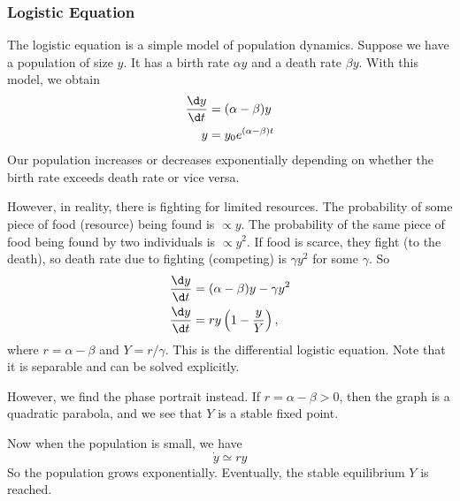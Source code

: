 \documentclass[a4paper]{article}
\begin{document}
\subsubsection{Logistic Equation}
The logistic equation is a simple model of population dynamics. Suppose we have a population of size $y$. It has a birth rate $\alpha y$ and a death rate $\beta y$. With this model, we obtain
\begin{align*}
  \frac{\d y}{\d t} &= (\alpha - \beta)y\\
  y &= y_0 e^{(\alpha - \beta)t}
\end{align*}
Our population increases or decreases exponentially depending on whether the birth rate exceeds death rate or vice versa.

However, in reality, there is fighting for limited resources. The probability of some piece of food (resource) being found is $\propto y$. The probability of the same piece of food being found by two individuals is $\propto y^2$. If food is scarce, they fight (to the death), so death rate due to fighting (competing) is $\gamma y^2$ for some $\gamma$. So
\begin{align*}
  \frac{\d y}{\d t} &= (\alpha - \beta)y - \gamma y^2\\
  \frac{\d y}{\d t}&= ry \left(1 - \frac{y}{Y}\right),
\end{align*}
where $r = \alpha - \beta$ and $Y = r/\gamma$. This is the differential logistic equation. Note that it is separable and can be solved explicitly.

However, we find the phase portrait instead. If $r = \alpha - \beta > 0$, then the graph is a quadratic parabola, and we see that $Y$ is a stable fixed point.
\begin{center}
\end{center}
Now when the population is small, we have
\[
  \dot y \simeq ry
\]
So the population grows exponentially. Eventually, the stable equilibrium $Y$ is reached.
\end{document}
